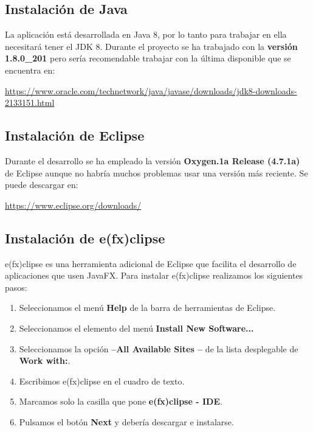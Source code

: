 \subsection{Instalación de Java}

La aplicación está desarrollada en Java 8, por lo tanto para trabajar en ella necesitará tener el JDK 8. Durante el proyecto se ha trabajado con la \textbf{versión 1.8.0\_201} pero sería recomendable trabajar con la última disponible que se encuentra en:

\href{
https://www.oracle.com/technetwork/java/javase/downloads/jdk8-downloads-2133151.html}{https://www.oracle.com/technetwork/java/javase/downloads/jdk8-downloads-2133151.html}

\subsection{Instalación de Eclipse}

Durante el desarrollo se ha empleado la versión \textbf{Oxygen.1a Release (4.7.1a)} de Eclipse aunque no habría muchos problemas usar una versión más reciente. Se puede descargar en:

\href{https://www.eclipse.org/downloads/}{https://www.eclipse.org/downloads/}

\subsection{Instalación de e(fx)clipse}

e(fx)clipse es una herramienta adicional de Eclipse que facilita el desarrollo de aplicaciones que usen JavaFX. 
Para instalar e(fx)clipse realizamos los siguientes pasos:

\begin{enumerate}
	\item Seleccionamos el menú \textbf{Help} de la barra de herramientas de Eclipse.
	\item Seleccionamos el elemento del menú \textbf{Install New Software...}
	
	
	\item Seleccionamos la opción \textbf{--All Available Sites --} de la lista desplegable de \textbf{Work with:}.
	\item Escribimos e(fx)clipse en el cuadro de texto.
	\item Marcamos solo la casilla que pone \textbf{e(fx)clipse - IDE}.
	\item Pulsamos el botón \textbf{Next} y debería descargar e instalarse.
\end{enumerate}


